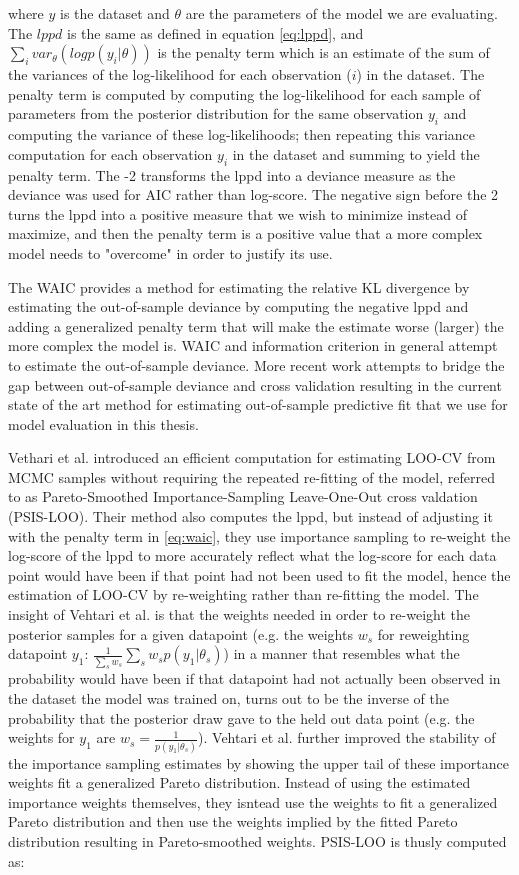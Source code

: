 where $y$ is the dataset and $\theta$ are the parameters of the model we are evaluating. The $lppd$ is the same as defined in equation \ref{eq:lppd}, and $\sum_i var_{\theta}(logp(y_i|\theta))$ is the penalty term which is an estimate of the sum of the variances of the log-likelihood for each observation ($i$) in the dataset. The penalty term is computed by computing the log-likelihood for each sample of parameters from the posterior distribution for the same observation $y_i$ and computing the variance of these log-likelihoods; then repeating this variance computation for each observation $y_i$ in the dataset and summing to yield the penalty term. The -2 transforms the lppd into a deviance measure as the deviance was used for AIC rather than log-score. The negative sign before the 2 turns the lppd into a positive measure that we wish to minimize instead of maximize, and then the penalty term is a positive value that a more complex model needs to "overcome" in order to justify its use.

The WAIC provides a method for estimating the relative KL divergence by estimating the out-of-sample deviance by computing the negative lppd and adding a generalized penalty term that will make the estimate worse (larger) the more complex the model is. WAIC and information criterion in general attempt to estimate the out-of-sample deviance. More recent work attempts to bridge the gap between out-of-sample deviance and cross validation resulting in the current state of the art method for estimating out-of-sample predictive fit that we use for model evaluation in this thesis.

Vethari et al. \cite{Vehtari2016} introduced an efficient computation for estimating LOO-CV from MCMC samples without requiring the repeated re-fitting of the model, referred to as Pareto-Smoothed Importance-Sampling Leave-One-Out cross valdation (PSIS-LOO). Their method also computes the lppd, but instead of adjusting it with the penalty term in \ref{eq:waic}, they use importance sampling to re-weight the log-score of the lppd to more accurately reflect what the log-score for each data point would have been if that point had not been used to fit the model, hence the estimation of LOO-CV by re-weighting rather than re-fitting the model. The insight of Vehtari et al. is that the weights needed in order to re-weight the posterior samples for a given datapoint (e.g. the weights $w_s$ for reweighting datapoint $y_1$: $\frac{1}{\sum_s w_s} \sum_s w_s p(y_1 | \theta_s)$) in a manner that resembles what the probability would have been if that datapoint had not actually been observed in the dataset the model was trained on, turns out to be the inverse of the probability that the posterior draw gave to the held out data point (e.g. the weights for $y_1$ are $w_s = \frac{1}{p(y_1|\theta_s)}$). Vehtari et al. further improved the stability of the importance sampling estimates by showing the upper tail of these importance weights fit a generalized Pareto distribution. Instead of using the estimated importance weights themselves, they isntead use the weights to fit a generalized Pareto distribution and then use the weights implied by the fitted Pareto distribution resulting in Pareto-smoothed weights. PSIS-LOO is thusly computed as:

